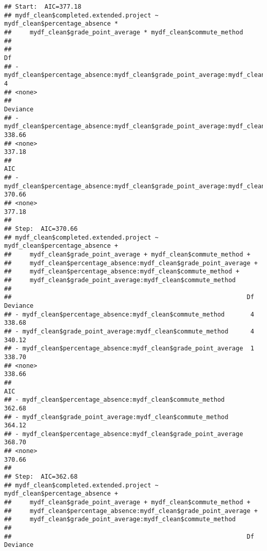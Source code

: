 \documentclass[
]{article}
\begin{document}
\begin{verbatim}
## Start:  AIC=377.18
## mydf_clean$completed.extended.project ~ mydf_clean$percentage_absence * 
##     mydf_clean$grade_point_average * mydf_clean$commute_method
## 
##                                                                                          Df
## - mydf_clean$percentage_absence:mydf_clean$grade_point_average:mydf_clean$commute_method  4
## <none>                                                                                     
##                                                                                          Deviance
## - mydf_clean$percentage_absence:mydf_clean$grade_point_average:mydf_clean$commute_method   338.66
## <none>                                                                                     337.18
##                                                                                             AIC
## - mydf_clean$percentage_absence:mydf_clean$grade_point_average:mydf_clean$commute_method 370.66
## <none>                                                                                   377.18
## 
## Step:  AIC=370.66
## mydf_clean$completed.extended.project ~ mydf_clean$percentage_absence + 
##     mydf_clean$grade_point_average + mydf_clean$commute_method + 
##     mydf_clean$percentage_absence:mydf_clean$grade_point_average + 
##     mydf_clean$percentage_absence:mydf_clean$commute_method + 
##     mydf_clean$grade_point_average:mydf_clean$commute_method
## 
##                                                                Df Deviance
## - mydf_clean$percentage_absence:mydf_clean$commute_method       4   338.68
## - mydf_clean$grade_point_average:mydf_clean$commute_method      4   340.12
## - mydf_clean$percentage_absence:mydf_clean$grade_point_average  1   338.70
## <none>                                                              338.66
##                                                                   AIC
## - mydf_clean$percentage_absence:mydf_clean$commute_method      362.68
## - mydf_clean$grade_point_average:mydf_clean$commute_method     364.12
## - mydf_clean$percentage_absence:mydf_clean$grade_point_average 368.70
## <none>                                                         370.66
## 
## Step:  AIC=362.68
## mydf_clean$completed.extended.project ~ mydf_clean$percentage_absence + 
##     mydf_clean$grade_point_average + mydf_clean$commute_method + 
##     mydf_clean$percentage_absence:mydf_clean$grade_point_average + 
##     mydf_clean$grade_point_average:mydf_clean$commute_method
## 
##                                                                Df Deviance

\end{verbatim}
\end{document}
